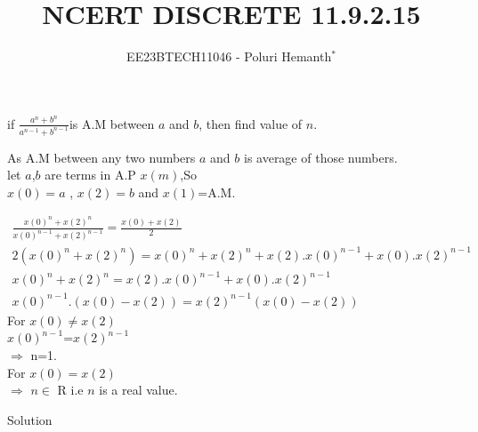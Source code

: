 \documentclass[journal,12pt,twocolumn]{IEEEtran}
\theoremstyle{remark}
\begin{document}

\vspace{3cm}


\title{NCERT DISCRETE 11.9.2.15}
\author{EE23BTECH11046 - Poluri Hemanth$^{*}$}



if \( \frac{a^n +b^n}{a^{n-1} + b^{n-1}}\)is A.M between $a$ and $b$, then find value of $n$.
\break

 As A.M between any two numbers $a$ and $b$ is average of those  numbers.\\
 let $a$,$b$ are terms in A.P $x(m)$,So\\
 $x(0)=a$ , $x(2)=b$ and $x(1)$=A.M.
 
 \begin{align}	 
      \frac{x(0)^n +x(2)^n}{x(0)^{n-1} + x(2)^{n-1}}= \frac{x(0)+x(2)}{2}  \\
      2(x(0)^n +x(2)^n) = x(0)^n +x(2)^n +x(2).x(0)^{n-1}+x(0).x(2)^{n-1} \\
      x(0)^n +x(2)^n = x(2).x(0)^{n-1}+x(0).x(2)^{n-1} \\
      x(0)^{n-1}.(x(0)-x(2))=x(2)^{n-1}(x(0)-x(2))
 \end{align}
 For $x(0) \neq x(2)$ \\
 $x(0)^{n-1}$=$x(2)^{n-1}$ \\
 $\Rightarrow$ n=1.\\
  For $x(0)=x(2)$\\
$\Rightarrow$ $n\in$ R  i.e $n$ is a real value.\newline
\begin{table}[h!]
    
    \caption{Solution}
    \label{tab:11.9.2.15}
\end{table}
\end{document}
